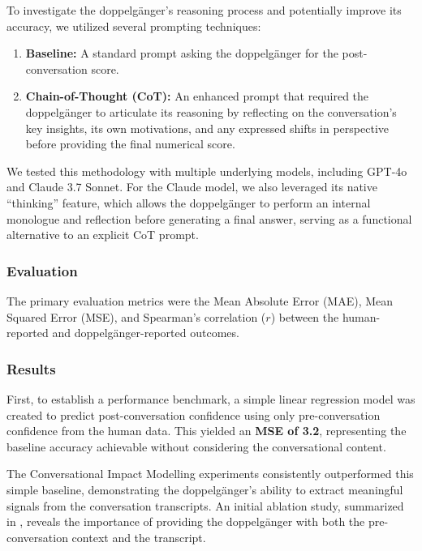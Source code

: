 To investigate the doppelgänger's reasoning process and potentially improve its accuracy, we utilized several prompting techniques:

\begin{enumerate}
    \item \textbf{Baseline:} A standard prompt asking the doppelgänger for the post-conversation score.
    \item \textbf{Chain-of-Thought (CoT):} An enhanced prompt that required the doppelgänger to articulate its reasoning by reflecting on the conversation's key insights, its own motivations, and any expressed shifts in perspective before providing the final numerical score.
\end{enumerate}

We tested this methodology with multiple underlying models, including GPT-4o and Claude 3.7 Sonnet. For the Claude model, we also leveraged its native ``thinking'' feature, which allows the doppelgänger to perform an internal monologue and reflection before generating a final answer, serving as a functional alternative to an explicit CoT prompt.

\subsubsection{Evaluation}
The primary evaluation metrics were the Mean Absolute Error (MAE), Mean Squared Error (MSE), and Spearman's correlation ($r$) between the human-reported and doppelgänger-reported outcomes.

\subsubsection{Results}
First, to establish a performance benchmark, a simple linear regression model was created to predict post-conversation confidence using only pre-conversation confidence from the human data. This yielded an \textbf{MSE of 3.2}, representing the baseline accuracy achievable without considering the conversational content.

The Conversational Impact Modelling experiments consistently outperformed this simple baseline, demonstrating the doppelgänger's ability to extract meaningful signals from the conversation transcripts. An initial ablation study, summarized in , reveals the importance of providing the doppelgänger with both the pre-conversation context and the transcript.



